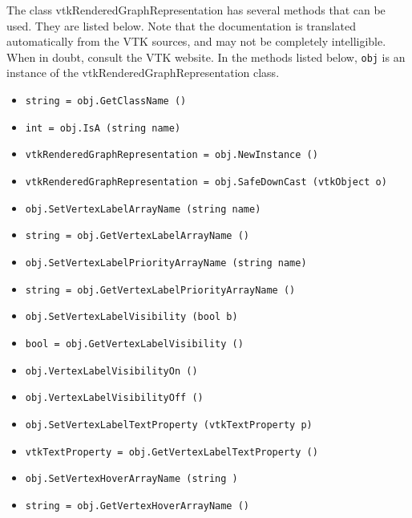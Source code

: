 The class vtkRenderedGraphRepresentation has several methods that can be used.
  They are listed below.
Note that the documentation is translated automatically from the VTK sources,
and may not be completely intelligible.  When in doubt, consult the VTK website.
In the methods listed below, \verb|obj| is an instance of the vtkRenderedGraphRepresentation class.
\begin{itemize}
\item  \verb|string = obj.GetClassName ()|

\item  \verb|int = obj.IsA (string name)|

\item  \verb|vtkRenderedGraphRepresentation = obj.NewInstance ()|

\item  \verb|vtkRenderedGraphRepresentation = obj.SafeDownCast (vtkObject o)|

\item  \verb|obj.SetVertexLabelArrayName (string name)|

\item  \verb|string = obj.GetVertexLabelArrayName ()|

\item  \verb|obj.SetVertexLabelPriorityArrayName (string name)|

\item  \verb|string = obj.GetVertexLabelPriorityArrayName ()|

\item  \verb|obj.SetVertexLabelVisibility (bool b)|

\item  \verb|bool = obj.GetVertexLabelVisibility ()|

\item  \verb|obj.VertexLabelVisibilityOn ()|

\item  \verb|obj.VertexLabelVisibilityOff ()|

\item  \verb|obj.SetVertexLabelTextProperty (vtkTextProperty p)|

\item  \verb|vtkTextProperty = obj.GetVertexLabelTextProperty ()|

\item  \verb|obj.SetVertexHoverArrayName (string )|

\item  \verb|string = obj.GetVertexHoverArrayName ()|


\end{itemize}
